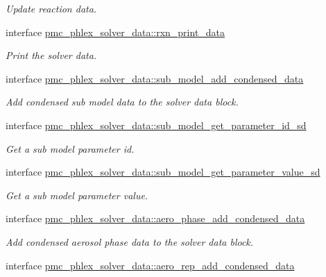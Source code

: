 \begin{DoxyCompactItemize}
\begin{DoxyCompactList}\small\item\em Update reaction data. \end{DoxyCompactList}\item 
interface \mbox{\hyperlink{interfacepmc__phlex__solver__data_1_1rxn__print__data}{pmc\+\_\+phlex\+\_\+solver\+\_\+data\+::rxn\+\_\+print\+\_\+data}}
\begin{DoxyCompactList}\small\item\em Print the solver data. \end{DoxyCompactList}\item 
interface \mbox{\hyperlink{interfacepmc__phlex__solver__data_1_1sub__model__add__condensed__data}{pmc\+\_\+phlex\+\_\+solver\+\_\+data\+::sub\+\_\+model\+\_\+add\+\_\+condensed\+\_\+data}}
\begin{DoxyCompactList}\small\item\em Add condensed sub model data to the solver data block. \end{DoxyCompactList}\item 
interface \mbox{\hyperlink{interfacepmc__phlex__solver__data_1_1sub__model__get__parameter__id__sd}{pmc\+\_\+phlex\+\_\+solver\+\_\+data\+::sub\+\_\+model\+\_\+get\+\_\+parameter\+\_\+id\+\_\+sd}}
\begin{DoxyCompactList}\small\item\em Get a sub model parameter id. \end{DoxyCompactList}\item 
interface \mbox{\hyperlink{interfacepmc__phlex__solver__data_1_1sub__model__get__parameter__value__sd}{pmc\+\_\+phlex\+\_\+solver\+\_\+data\+::sub\+\_\+model\+\_\+get\+\_\+parameter\+\_\+value\+\_\+sd}}
\begin{DoxyCompactList}\small\item\em Get a sub model parameter value. \end{DoxyCompactList}\item 
interface \mbox{\hyperlink{interfacepmc__phlex__solver__data_1_1aero__phase__add__condensed__data}{pmc\+\_\+phlex\+\_\+solver\+\_\+data\+::aero\+\_\+phase\+\_\+add\+\_\+condensed\+\_\+data}}
\begin{DoxyCompactList}\small\item\em Add condensed aerosol phase data to the solver data block. \end{DoxyCompactList}\item 
interface \mbox{\hyperlink{interfacepmc__phlex__solver__data_1_1aero__rep__add__condensed__data}{pmc\+\_\+phlex\+\_\+solver\+\_\+data\+::aero\+\_\+rep\+\_\+add\+\_\+condensed\+\_\+data}}

\end{DoxyCompactItemize}

